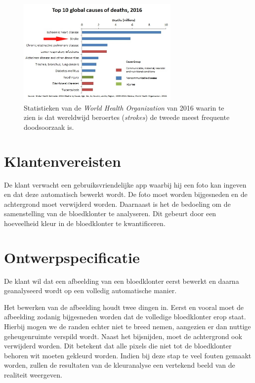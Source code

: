 \documentclass[a4paper,kulak]{kulakarticle}
\begin{document}
		\begin{figure}[h]
			\centering
			\includegraphics[width = 0.7\textwidth]{top10doodsoorzaken.jpg}
			
			\caption{Statistieken van de \textit{World Health Organization} van 2016 waarin te zien is dat wereldwijd beroertes (\textit{strokes}) de tweede meest frequente doodsoorzaak is.}
			\label{figuur doodsoorzaken}
		\end{figure}
	\newpage
		
	\tableofcontents
	\newpage
		
	\section{Klantenvereisten}
		De klant verwacht een gebruiksvriendelijke app waarbij hij een foto kan ingeven en dat deze automatisch bewerkt wordt. De foto moet  worden bijgesneden en de achtergrond moet verwijderd worden. Daarnaast is het de bedoeling om de samenstelling van de bloedklonter te analyseren. Dit gebeurt door een hoeveelheid kleur in de bloedklonter te kwantificeren. 
	
	\section{Ontwerpspecificatie}
		De klant wil dat een afbeelding van een bloedklonter eerst bewerkt en daarna geanalyseerd wordt op een volledig automatische manier.
		
		Het bewerken van de afbeelding houdt twee dingen in. Eerst en vooral moet de afbeelding zodanig bijgesneden worden dat de volledige bloedklonter erop staat. Hierbij mogen we de randen echter niet te breed nemen, aangezien er dan nuttige geheugenruimte verspild wordt. 
		Naast het bijsnijden, moet de achtergrond ook verwijderd worden. Dit betekent dat alle pixels die niet tot de bloedklonter behoren wit moeten gekleurd worden. Indien bij deze stap te veel fouten gemaakt worden, zullen de resultaten van de kleuranalyse een vertekend beeld van de realiteit weergeven.
		
\end{document}
